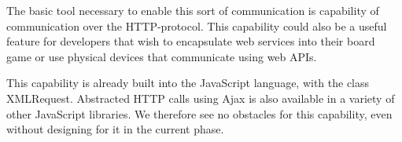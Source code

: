 The basic tool necessary to enable this sort of communication is capability of communication over the HTTP-protocol. This capability could also be a useful feature for developers that wish to encapsulate web services into their board game or use physical devices that communicate using web APIs. 

This capability is already built into the JavaScript language, with the class XMLRequest. Abstracted HTTP calls using Ajax is also available in a variety of other JavaScript libraries. We therefore see no obstacles for this capability, even without designing for it in the current phase.